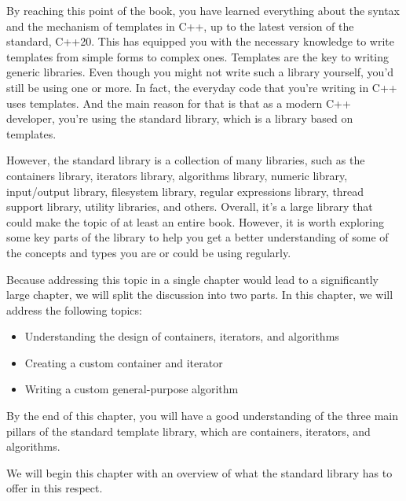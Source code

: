 By reaching this point of the book, you have learned everything about the syntax and the mechanism of templates in C++, up to the latest version of the standard, C++20. This has equipped you with the necessary knowledge to write templates from simple forms to complex ones. Templates are the key to writing generic libraries. Even though you might not write such a library yourself, you’d still be using one or more. In fact, the everyday code that you’re writing in C++ uses templates. And the main reason for that is that as a modern C++ developer, you’re using the standard library, which is a library based on templates.

However, the standard library is a collection of many libraries, such as the containers library, iterators library, algorithms library, numeric library, input/output library, filesystem library, regular expressions library, thread support library, utility libraries, and others. Overall, it’s a large library that could make the topic of at least an entire book. However, it is worth exploring some key parts of the library to help you get a better understanding of some of the concepts and types you are or could be using regularly.

Because addressing this topic in a single chapter would lead to a significantly large chapter, we will split the discussion into two parts. In this chapter, we will address the following topics:

\begin{itemize}
\item
Understanding the design of containers, iterators, and algorithms

\item
Creating a custom container and iterator

\item
Writing a custom general-purpose algorithm
\end{itemize}

By the end of this chapter, you will have a good understanding of the three main pillars of the standard template library, which are containers, iterators, and algorithms.

We will begin this chapter with an overview of what the standard library has to offer in this respect.


